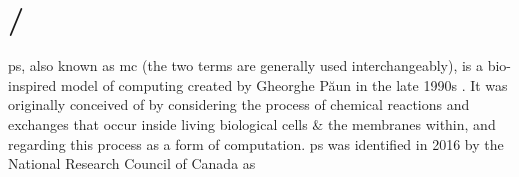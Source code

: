 \section{/}


\Gls{ps}, also known as \Gls{mc} (the two terms are generally used interchangeably), is a bio-inspired model of computing created by Gheorghe Păun in the late 1990s \cite{tPaun98a,Paun2000}.  It was originally conceived of by considering the process of chemical reactions and exchanges that occur inside living biological cells \& the membranes within, and regarding this process as a form of computation.  \Gls{ps} was identified in 2016 by the National Research Council of Canada as 

